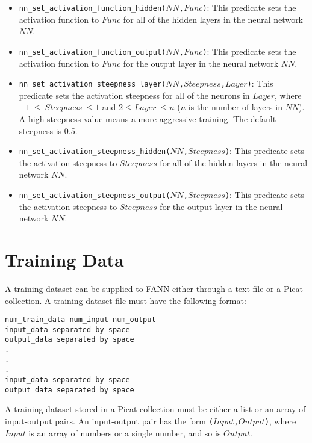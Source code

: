\begin{itemize}
\item \texttt{nn\_set\_activation\_function\_hidden($NN$,$Func$)}: This predicate sets the activation function to $Func$ for all of the hidden layers in the neural network $NN$.

\item \texttt{nn\_set\_activation\_function\_output($NN$,$Func$)}: This predicate sets the activation function to $Func$ for the output layer in the neural network $NN$.

\item \texttt{nn\_set\_activation\_steepness\_layer($NN$,$Steepness$,$Layer$)}: This predicate sets the activation steepness for all of the neurons in $Layer$, where $-1\ \le\ Steepness\ \le 1$ and $2 \le Layer\ \le n$ ($n$ is the number of layers in $NN$).  A high steepness value means a more aggressive training. The default steepness is 0.5.

\item \texttt{nn\_set\_activation\_steepness\_hidden($NN$,$Steepness$)}: This predicate sets the activation steepness to $Steepness$ for all of the hidden layers in the neural network $NN$.

\item \texttt{nn\_set\_activation\_steepness\_output($NN$,$Steepness$)}: This predicate sets the activation steepness to $Steepness$ for the output layer in the neural network $NN$.
\end{itemize}

\section{Training Data}
A training dataset can be supplied to FANN either through a text file or a Picat collection. A training dataset file must have the following format:

\begin{verbatim}
num_train_data num_input num_output
input_data separated by space
output_data separated by space
.
.
.
input_data separated by space
output_data separated by space
\end{verbatim}
A training dataset stored in a Picat collection must be either a list or an array of input-output pairs. An input-output pair has the form \texttt{($Input$,$Output$)}, where $Input$ is an array of numbers or a single number, and so is $Output$.

